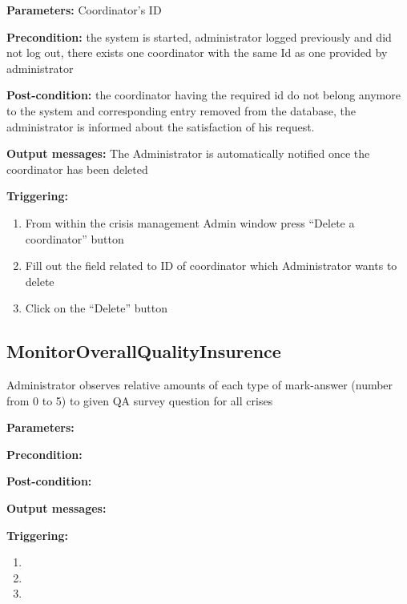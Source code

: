 \begin{description}

\item \textbf{Parameters:} Coordinator's ID
\item \textbf{Precondition:} the system is started, administrator logged
previously and did not log out, there exists one coordinator with the same Id
as one provided by administrator
\item \textbf{Post-condition:} the coordinator having the
required id do not belong anymore to the system and corresponding entry removed
from the database, the administrator is informed about the satisfaction of his
request.
\item \textbf{Output messages:} The Administrator is automatically notified once
the coordinator has been deleted

\item \textbf{Triggering:}
\begin{enumerate}
\item From within the crisis management Admin window press ``Delete a
coordinator'' button
\item Fill out the field related to ID of coordinator which Administrator wants
to delete
\item Click on the ``Delete'' button
\end{enumerate}

\end{description}

\subsection{MonitorOverallQualityInsurence}

Administrator observes relative amounts of each type of mark-answer
(number from 0 to 5) to given QA survey question for all crises

\begin{description}

\item \textbf{Parameters:} 
\item \textbf{Precondition:}
\item \textbf{Post-condition:}
\item \textbf{Output messages:}

\item \textbf{Triggering:}
\begin{enumerate}
\item
\item
\item
\end{enumerate}

\end{description}

